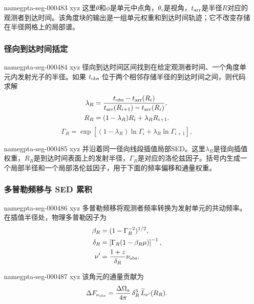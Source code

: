 \documentclass[twocolumn]{aastex702}
\makeatletter
\providecommand{\gptareaderanchor}[1]{\pdfdest name{#1} xyz}%
\providecommand{\gptareaderanchor}[1]{\special{pdf:dest (#1) [ @thispage /XYZ @xpos @ypos null ]}}%
\makeatother
\begin{document}
\gptareaderanchor{gpta-seg-000483}%
这里\(\theta\)和\(\phi\)是单元中点角，\(\theta_v\)是视角，\(t_{\rm arr}\)是半径\(R\)对应的观测者到达时间。该角度块的输出是一组单元权重和到达时间轨迹；它不改变存储在半径网格上的局部谱。

\subsubsection{径向到达时间括定}


\gptareaderanchor{gpta-seg-000484}%
径向到达时间区间找到在给定观测者时间、一个角度单元内发射光子的半径。如果 \(t_{\rm obs}\) 位于两个相邻存储半径的到达时间之间，则代码求解
\begin{equation}
\begin{aligned}
\lambda_R&=\frac{t_{\rm obs}-t_{\rm arr}(R_i)}
{t_{\rm arr}(R_{i+1})-t_{\rm arr}(R_i)},\\
R_R&=(1-\lambda_R)R_i+\lambda_RR_{i+1}.
\end{aligned}
\end{equation}
\begin{equation}
\Gamma_R=\exp\!\left[(1-\lambda_R)\ln\Gamma_i+\lambda_R\ln\Gamma_{i+1}\right],
\end{equation}

\gptareaderanchor{gpta-seg-000485}%
并沿着同一径向线段插值局部SED。这里\(\lambda_R\)是径向插值权重，\(R_R\)是到达时间表面上的发射半径，\(\Gamma_R\)是对应的洛伦兹因子。括号内生成一个局部半径和一个局部洛伦兹因子，用于下面的频率偏移和通量权重。

\subsubsection{多普勒频移与 SED 累积}


\gptareaderanchor{gpta-seg-000486}%
多普勒频移将观测者频率转换为发射单元的共动频率。在插值半径处，物理多普勒因子为
\begin{equation}
\begin{aligned}
\beta_R&=(1-\Gamma_R^{-2})^{1/2},\\
\delta_R&=\left[\Gamma_R(1-\beta_R\mu)\right]^{-1},\\
\nu'&=\frac{1+z}{\delta_R}\nu_{\rm obs}.
\end{aligned}
\end{equation}

\gptareaderanchor{gpta-seg-000487}%
该角元的通量贡献为
\begin{equation}
\Delta F_{\nu_{\rm obs}}=
\frac{\Delta\Omega_a}{4\pi}\,
\delta_R^3\,
\widetilde L_{\nu'}(R_R).
\end{equation}
\end{document}
